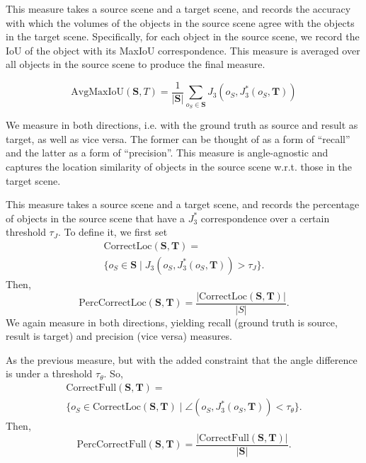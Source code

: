 \documentclass[10pt,twocolumn,letterpaper]{article}
\newcommand{\bb}[1]{{\bm{#1}}}
\begin{document}
\begin{description}\itemsep0pt
    \item[Average Max IoU] This measure takes a source scene and a target
        scene, and records the accuracy with which the volumes of the objects
        in the source scene agree with the objects in the target scene.
        Specifically, for each object in the source scene, we record the IoU of
        the object with its MaxIoU correspondence.  This measure is averaged
        over all objects in the source scene to produce the final measure. 

        \[ \mathrm{AvgMaxIoU}(\bb{S}, T) = \frac{1}{|\bb{S}|} \sum_{o_S \in \bb{S}} J_3(o_S, J_3^*(o_S, \bb{T})) \]

        We measure in both directions, i.e. with the ground truth as source and
        result as target, as well as vice versa.  The former can be thought of
        as a form of ``recall'' and the latter as a form of ``precision''. This
        measure is angle-agnostic and captures the location similarity of objects in the source
        scene w.r.t. those in the target scene.
    \item[Percentage correct location] This measure takes a source scene and a
        target scene, and records the percentage of objects in the source scene
        that have a $J_3^*$ correspondence over a certain threshold
        $\tau_{J}$. To define it, we first set
        \begin{multline*}
            \mathrm{CorrectLoc}(\bb{S}, \bb{T}) = \\ \{ o_S \in \bb{S} \mid J_3(o_S, J_3^*(o_S, \bb{T})) > \tau_{J} \}.
        \end{multline*}
        Then,
        \[ \mathrm{PercCorrectLoc}(\bb{S}, \bb{T}) = \frac{|\mathrm{CorrectLoc}(\bb{S}, \bb{T})|}{|S|}. \]
        We again measure in both directions, yielding recall (ground truth is source, result is target)
        and precision (vice versa) measures.
    \item[Percentage correct] As the previous measure, but with the added constraint that the
        angle difference is under a threshold $\tau_{\theta}$. So,
        \begin{multline*}
            \mathrm{CorrectFull}(\bb{S}, \bb{T}) = \\ \{ o_S \in \mathrm{CorrectLoc}(\bb{S}, \bb{T}) \mid \angle(o_S, J_3^*(o_S, \bb{T})) < \tau_{\theta} \}. 
        \end{multline*}
        Then,
        \[ \mathrm{PercCorrectFull}(\bb{S}, \bb{T}) = \frac{|\mathrm{CorrectFull}(\bb{S}, \bb{T})|}{|\bb{S}|}. \]

\end{description}
\end{document}
